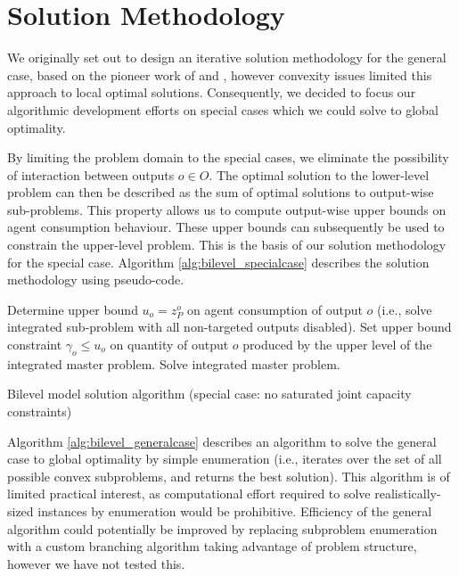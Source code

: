 \section{Solution Methodology}

We originally set out to design an iterative solution methodology for the general case, based on the pioneer work of \citet{fortuny1981representation} and \citet{bard1982explicit}, however convexity issues limited this approach to local optimal solutions. 
Consequently, we decided to focus our algorithmic development efforts on special cases which we could solve to global optimality.

By limiting the problem domain to the special cases, we eliminate the possibility of interaction between outputs $o \in O$.
The optimal solution to the lower-level problem can then be described as the sum of optimal solutions to output-wise sub-problems.  
This property allows us to compute output-wise upper bounds on agent consumption behaviour.
These upper bounds can subsequently be used to constrain the upper-level problem.
This is the basis of our solution methodology for the special case.
Algorithm \ref{alg:bilevel_specialcase} describes the solution methodology using pseudo-code.

\vspace{12pt}
\begin{algorithm}[H]
  \DontPrintSemicolon
  \BlankLine
   {
    Determine upper bound $u_o = z_P^o$ on agent consumption of output $o$ (i.e., solve integrated sub-problem with all non-targeted outputs disabled). \;
  }
   {
    Set upper bound constraint $\gamma_o \leq u_o$ on quantity of output $o$ produced by the upper level of the integrated master problem. \;
  }
  Solve integrated master problem. \;
  \caption{Bilevel model solution algorithm (special case: no saturated joint capacity constraints)}
  \label{alg:bilevel_specialcase}
\end{algorithm}
\vspace{12pt}

Algorithm \ref{alg:bilevel_generalcase} describes an algorithm to solve the general case to global optimality by simple enumeration (i.e., iterates over the set of all possible convex subproblems, and returns the best solution). This algorithm is of limited practical interest, as computational effort required to solve realistically-sized instances by enumeration would be prohibitive. Efficiency of the general algorithm could potentially be improved by replacing subproblem enumeration with a custom branching algorithm taking advantage of problem structure, however we have not tested this.


